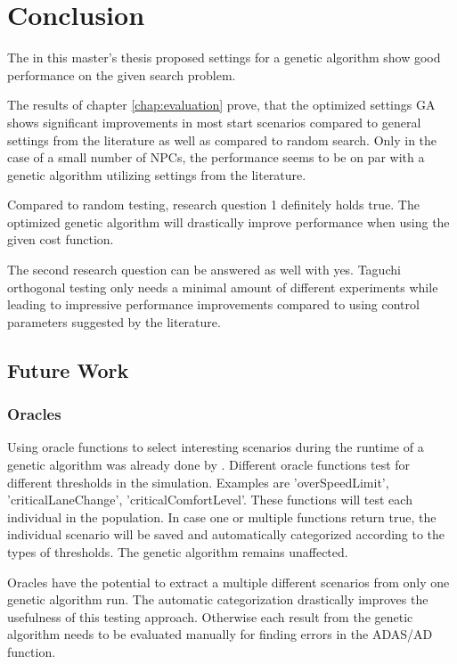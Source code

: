 \chapter{Conclusion}
The in this master's thesis proposed settings for a genetic algorithm show good performance on the given search problem.

The results of chapter \ref{chap:evaluation} prove, that the optimized settings GA shows significant improvements in most start scenarios compared to general settings from the literature as well as compared to random search. Only in the case of a small number of NPCs, the performance seems to be on par with a genetic algorithm utilizing settings from the literature.

Compared to random testing, research question 1 definitely holds true. The optimized genetic algorithm will drastically improve performance when using the given cost function.

The second research question can be answered as well with yes. Taguchi orthogonal testing only needs a minimal amount of different experiments while leading to impressive performance improvements compared to using control parameters suggested by the literature.

\section{Future Work}
\subsection{Oracles}
Using oracle functions to select interesting scenarios during the runtime of a genetic algorithm was already done by \cite{almanee_scenorita_2021}. Different oracle functions test for different thresholds in the simulation. Examples are 'overSpeedLimit', 'criticalLaneChange', 'criticalComfortLevel'. These functions will test each individual in the population. In case one or multiple functions return true, the individual scenario will be saved and automatically categorized according to the types of thresholds. The genetic algorithm remains unaffected.

Oracles have the potential to extract a multiple different scenarios from only one genetic algorithm run. The automatic categorization drastically improves the usefulness of this testing approach. Otherwise each result from the genetic algorithm needs to be evaluated manually for finding errors in the ADAS/AD function.
